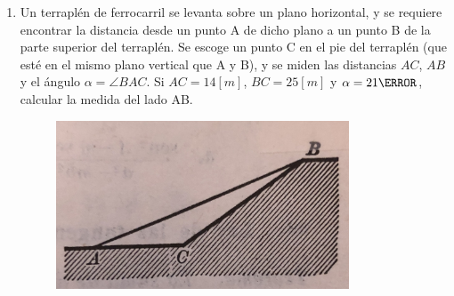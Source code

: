 \documentclass[letterpaper,11pt]{article}
\begin{document}
\begin{enumerate}
\begin{multicols}{2}
\begin{enumerate}
        \item Los segmentos $\overline{OA}$, $\overline{OB}$ y $\overline{EF}$.\\
        Concluya que:
        $$\cos\left(\alpha+\beta\right)=\cos\alpha\cos\beta-\sin\alpha\sin\beta$$
    \end{enumerate}
\end{multicols}


\item Un terraplén de ferrocarril se levanta sobre un plano horizontal, y se requiere encontrar la distancia desde un punto A de dicho plano a un punto B de la parte superior del terraplén. Se escoge un punto C en el pie del terraplén (que esté en el mismo plano vertical que A y B), y se miden las distancias $AC$, $AB$ y el ángulo $\alpha = \angle BAC$. Si $AC = 14[m]$, $BC = 25 [m]$ y $\alpha = 21\degree$, calcular la medida del lado AB.\\


 \begin{figure}[H]
    \centering
     \includegraphics[height=5cm]{2022-2/Imagenes/t1p2.jpg}
 \end{figure}



%   

\end{enumerate}
\end{document}
